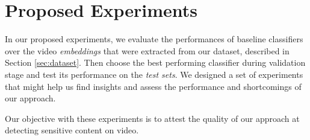 \section{Proposed Experiments}\label{sec:experiments}


In our proposed experiments, we evaluate the performances of baseline classifiers over the video \textit{embeddings} that were extracted from our dataset, described in Section \ref{sec:dataset}. Then choose the best performing classifier during validation stage and test its performance on the \textit{test sets}.  
We designed a set of experiments that might help us find insights and assess the performance and shortcomings of our approach.  



Our objective with these experiments is to attest the quality of our approach at detecting sensitive content on video.
 

